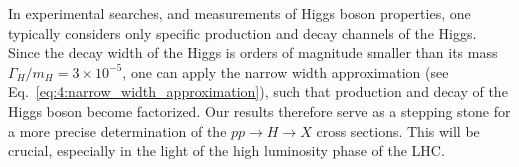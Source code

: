 In experimental searches, and measurements of Higgs boson properties, one typically considers only specific production and decay channels of the Higgs. Since the decay width of the Higgs is orders of magnitude smaller than its mass $\Gamma_H /m_H = 3 \times 10^{-5}$, one can apply the narrow width approximation (see Eq.~\eqref{eq:4:narrow_width_approximation}), such that production and decay of the Higgs boson become factorized. Our results therefore serve as a stepping stone for a more precise determination of the $pp \rightarrow H \rightarrow X$ cross sections. This will be crucial, especially in the light of the high luminosity phase of the \acs{LHC}.